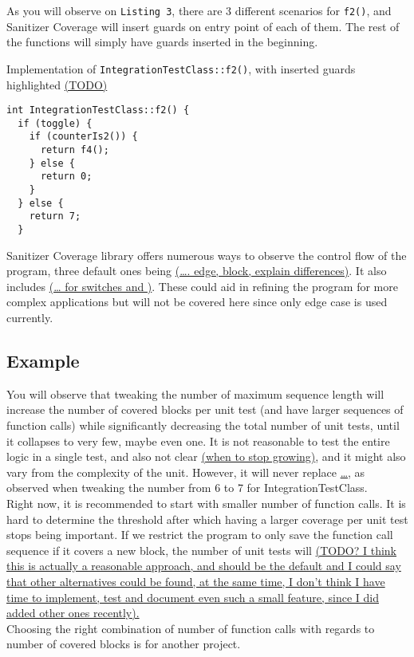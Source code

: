 \documentclass{elteikthesis}[2018/06/06]
\begin{document}
As you will observe on \texttt{Listing 3}, there are 3 different scenarios for \texttt{f2()}, and Sanitizer Coverage will insert guards on entry point of each of them. The rest of the functions will simply have guards inserted in the beginning. \\

\begin{listing}
\caption{Implementation of \texttt{IntegrationTestClass::f2()}, with inserted guards highlighted \uline{(TODO)}}
\begin{verbatim}
int IntegrationTestClass::f2() {
  if (toggle) {
    if (counterIs2()) {
      return f4();
    } else {
      return 0;
    }
  } else {
    return 7;
  }
\end{verbatim}
\end{listing}

Sanitizer Coverage library offers numerous ways to observe the control flow of the program, three default ones being \uline{(\ldots{}. edge, block, explain differences)}. It also includes \uline{(\ldots{} for switches and )}. These could aid in refining the program for more complex applications but will not be covered here since only edge case is used currently. \\
\subsection{Example}
\label{sec-3-2-3}

You will observe that tweaking the number of maximum sequence length will increase the number of covered blocks per unit test (and have larger sequences of function calls) while significantly decreasing the total number of unit tests, until it collapses to very few, maybe even one. It is not reasonable to test the entire logic in a single test, and also not clear \uline{(when to stop growing)}, and it might also vary from the complexity of the unit. However, it will never replace \uline{\ldots{}}, as observed when tweaking the number from 6 to 7 for IntegrationTestClass. \\
Right now, it is recommended to start with smaller number of function calls. It is hard to determine the threshold after which having a larger coverage per unit test stops being important. If we restrict the program to only save the function call sequence if it covers a new block, the number of unit tests will \uline{(TODO? I think this is actually a reasonable approach, and should be the default and I could say that other alternatives could be found, at the same time, I don't think I have time to implement, test and document even such a small feature, since I did added other ones recently).}  \\
Choosing the right combination of number of function calls with regards to number of covered blocks is for another project. \\
\end{document}
